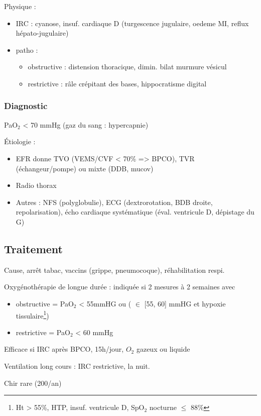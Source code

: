 \documentclass{article}
\begin{document}
Physique : 
\begin{itemize}
\item IRC : cyanose, insuf. cardiaque D (turgescence jugulaire, oedeme MI, reflux
  hépato-jugulaire)
\item patho : 
  \begin{itemize}
  \item obstructive : distension thoracique, dimin. bilat murmure vésicul
  \item restrictive : râle crépitant des bases, hippocratisme digital
  \end{itemize}
\end{itemize}

\subsubsection{Diagnostic}
\label{sec:org7599c0f}
PaO\(_{\text{2}}\) < 70 mmHg (gaz du sang : hypercapnie)

Étiologie :
\begin{itemize}
\item EFR donne TVO (VEMS/CVF < 70\% => BPCO), TVR (échangeur/pompe) ou
mixte (DDB, mucov)
\item  Radio thorax
\item Autres : NFS (polyglobulie), ECG (dextrorotation, BDB droite, repolarisation),
écho cardiaque systématique (éval. ventricule D, dépistage du G)
\end{itemize}

\subsection{Traitement}
\label{sec:org870a2d5}
Cause, arrêt tabac, vaccins (grippe, pneumocoque), réhabilitation respi.

Oxygénothérapie de longue durée : indiquée si 2 mesures à 2 semaines avec
\begin{itemize}
\item obstructive = PaO\(_{\text{2}}\) < 55mmHG ou ( \(\in\) [55, 60] mmHG et hypoxie
  tissulaire\footnote{Ht > 55\%, HTP, insuf. ventricule D, SpO\(_{\text{2}}\) nocturne \(\le\) 88\%})
\item restrictive = PaO\(_{\text{2}}\) < 60 mmHg
\end{itemize}
Efficace si  IRC après BPCO, 15h/jour, $O_2$ gazeux ou liquide

Ventilation long cours : IRC restrictive, la nuit.

Chir rare (200/an)
\end{document}
